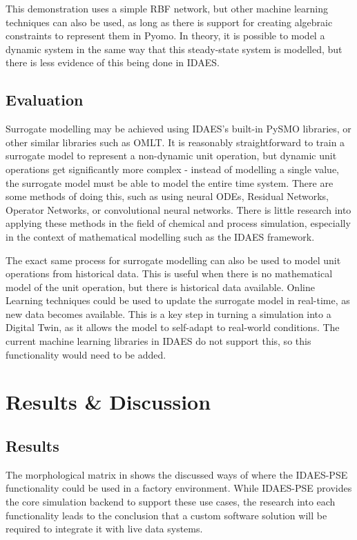 \documentclass[12pt]{article}
\begin{document}
This demonstration uses a simple RBF network, but other machine learning techniques can also be used, as long as there is support for creating algebraic constraints to represent them in Pyomo. In theory, it is possible to model a dynamic system in the same way that this steady-state system is modelled, but there is less evidence of this being done in IDAES.

\subsection{Evaluation}


Surrogate modelling may be achieved using IDAES's built-in PySMO libraries, or other similar libraries such as OMLT. 
It is reasonably straightforward to train a surrogate model to represent a non-dynamic unit operation, but dynamic unit operations get significantly more complex - instead of modelling a single value, the surrogate model must be able to model the entire time system. There are some methods of doing this, such as using neural ODEs, Residual Networks, Operator Networks, or convolutional neural networks. 
There is little research into applying these methods in the field of chemical and process simulation, especially in the context of mathematical modelling such as the IDAES framework.

The exact same process for surrogate modelling can also be used to model unit operations from historical data. 
This is useful when there is no mathematical model of the unit operation, but there is historical data available. 
Online Learning techniques could be used to update the surrogate model in real-time, as new data becomes available. This is a key step in turning a simulation into a Digital Twin, as it allows the model to self-adapt to real-world conditions. The current machine learning libraries in IDAES do not support this, so this functionality would need to be added.

\section{Results \& Discussion}
\subsection{Results}

The morphological matrix in  shows the discussed ways of where the IDAES-PSE functionality could be used in a factory environment. While IDAES-PSE provides the core simulation backend to support these use cases, the research into each functionality leads to the conclusion that a custom software solution will be required to integrate it with live data systems.
\end{document}
